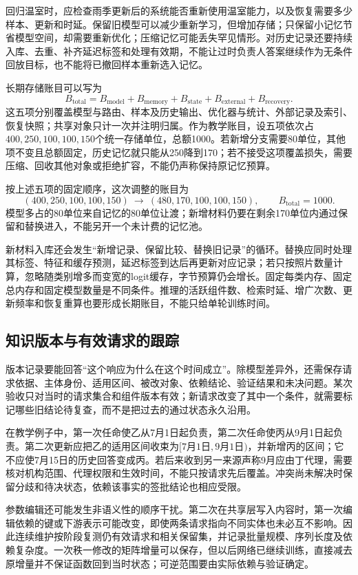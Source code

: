 回归温室时，应检查雨季更新后的系统能否重新使用温室能力，以及恢复需要多少样本、更新和时延。保留旧模型可以减少重新学习，但增加存储；只保留小记忆节省模型空间，却需要重新优化；压缩记忆可能丢失罕见情形。对历史记录还要持续入库、去重、补齐延迟标签和处理有效期，不能让过时负责人答案继续作为无条件回放目标，也不能将已撤回样本重新选入记忆。

长期存储账目可以写为
\[
B_{\mathrm{total}}
=B_{\mathrm{model}}+B_{\mathrm{memory}}+B_{\mathrm{state}}
+B_{\mathrm{external}}+B_{\mathrm{recovery}}.
\]
这五项分别覆盖模型与路由、样本及历史输出、优化器与统计、外部记录及索引、恢复快照；共享对象只计一次并注明归属。作为教学账目，设五项依次占$400,250,100,100,150$个统一存储单位，总额1000。若新增分支需要80单位，其他项不变且总额固定，历史记忆就只能从250降到170；若不接受这项覆盖损失，需要压缩、回收其他对象或拒绝扩容，不能仍声称保持原记忆预算。

按上述五项的固定顺序，这次调整的账目为
\[
(400,250,100,100,150)
\ \longrightarrow\
(480,170,100,100,150),
\qquad B_{\mathrm{total}}=1000.
\]
模型多占的80单位来自记忆的80单位让渡；新增材料仍要在剩余170单位内通过保留和替换进入，不能另开一个未计费的记忆池。

新材料入库还会发生“新增记录、保留比较、替换旧记录”的循环。替换应同时处理其标签、特征和缓存预测，延迟标签到达后再更新对应记录；若只按照片数量计算，忽略随类别增多而变宽的logit缓存，字节预算仍会增长。固定每类内存、固定总内存和固定模型数量是不同条件。推理的活跃组件数、检索时延、增广次数、更新频率和恢复重算也要形成长期账目，不能只给单轮训练时间。

\subsection{知识版本与有效请求的跟踪}
\label{sec:ket-update-versions}

版本记录要能回答“这个响应为什么在这个时间成立”。除模型差异外，还需保存请求依据、主体身份、适用区间、被改对象、依赖结论、验证结果和未决问题。某次验收只对当时的请求集合和组件版本有效；新请求改变了其中一个条件，就需要标记哪些旧结论待复查，而不是把过去的通过状态永久沿用。

在教学例子中，第一次任命使乙从7月1日起负责，第二次任命使丙从9月1日起负责。第二次更新应把乙的适用区间收束为$[\text{7月1日},\text{9月1日})$，并新增丙的区间；它不应使7月15日的历史回答变成丙。若后来收到另一来源声称9月应由丁代理，需要核对机构范围、代理权限和生效时间，不能只按请求先后覆盖。冲突尚未解决时保留分歧和待决状态，依赖该事实的签批结论也相应受限。

参数编辑还可能发生非语义性的顺序干扰。第二次在共享层写入内容时，第一次编辑依赖的键或下游表示可能改变，即使两条请求指向不同实体也未必互不影响。因此连续维护按阶段复测仍有效请求和相关保留集，并记录批量规模、序列长度及依赖复杂度。一次秩一修改的矩阵增量可以保存，但以后网络已继续训练，直接减去原增量并不保证函数回到当时状态；可逆范围要由实际依赖与验证确定。

